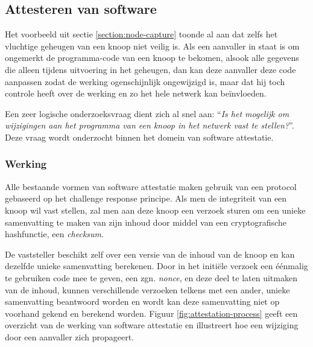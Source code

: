 \subsection{Attesteren van software}
\label{subsection:attestation}

Het voorbeeld uit sectie \ref{section:node-capture} toonde al aan dat zelfs het
vluchtige geheugen van een knoop niet veilig is. Als een aanvaller in staat is
om ongemerkt de programma-code van een knoop te bekomen, alsook alle gegevens
die alleen tijdens uitvoering in het geheugen, dan kan deze aanvaller deze code
aanpassen zodat de werking ogenschijnlijk ongewijzigd is, maar dat hij toch
controle heeft over de werking en zo het hele netwerk kan be\"invloeden.

Een zeer logische onderzoeksvraag dient zich al snel aan: ``\emph{Is het
mogelijk om wijzigingen aan het programma van een knoop in het netwerk vast te
stellen?}''. Deze vraag wordt onderzocht binnen het domein van software
attestatie.

\subsubsection*{Werking}

Alle bestaande vormen van software attestatie maken gebruik van een protocol
gebaseerd op het challenge response principe. Als men de integriteit van een
knoop wil vast stellen, zal men aan deze knoop een verzoek sturen om een unieke
samenvatting te maken van zijn inhoud door middel van een cryptografische
hashfunctie, een \emph{checksum}.

De vaststeller beschikt zelf over een versie van de inhoud van de knoop en kan
dezelfde unieke samenvatting berekenen. Door in het initi\"ele verzoek een
\'e\'enmalig te gebruiken code mee te geven, een zgn. \emph{nonce}, en deze
deel te laten uitmaken van de inhoud, kunnen verschillende verzoeken telkens
met een ander, unieke samenvatting beantwoord worden en wordt kan deze
samenvatting niet op voorhand gekend en berekend worden. Figuur
\ref{fig:attestation-process} geeft een overzicht van de werking van software
attestatie en illustreert hoe een wijziging door een aanvaller zich propageert.

